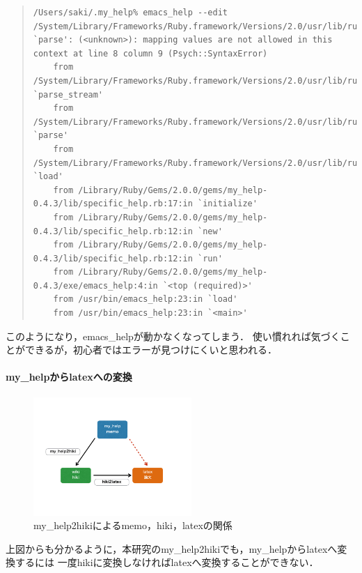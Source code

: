 \begin{quote}\begin{verbatim}
/Users/saki/.my_help% emacs_help --edit
/System/Library/Frameworks/Ruby.framework/Versions/2.0/usr/lib/ruby/2.0.0/psych.rb:205:in `parse': (<unknown>): mapping values are not allowed in this context at line 8 column 9 (Psych::SyntaxError)
	from /System/Library/Frameworks/Ruby.framework/Versions/2.0/usr/lib/ruby/2.0.0/psych.rb:205:in `parse_stream'
	from /System/Library/Frameworks/Ruby.framework/Versions/2.0/usr/lib/ruby/2.0.0/psych.rb:153:in `parse'
	from /System/Library/Frameworks/Ruby.framework/Versions/2.0/usr/lib/ruby/2.0.0/psych.rb:129:in `load'
	from /Library/Ruby/Gems/2.0.0/gems/my_help-0.4.3/lib/specific_help.rb:17:in `initialize'
	from /Library/Ruby/Gems/2.0.0/gems/my_help-0.4.3/lib/specific_help.rb:12:in `new'
	from /Library/Ruby/Gems/2.0.0/gems/my_help-0.4.3/lib/specific_help.rb:12:in `run'
	from /Library/Ruby/Gems/2.0.0/gems/my_help-0.4.3/exe/emacs_help:4:in `<top (required)>'
	from /usr/bin/emacs_help:23:in `load'
	from /usr/bin/emacs_help:23:in `<main>'
\end{verbatim}\end{quote}
\begin{description}
\item このようになり，emacs\_helpが動かなくなってしまう．
使い慣れれば気づくことができるが，初心者ではエラーが見つけにくいと思われる．
\end{description}

\paragraph{my\_helpからlatexへの変換}
\begin{figure}[htbp]\begin{center}
\includegraphics[width=6cm,bb=0 0 442 500]{my_help2hiki_saki.007.png}
\caption{my\_help2hikiによるmemo，hiki，latexの関係}
\label{default}\end{center}\end{figure}
\begin{description}
\item 上図からも分かるように，本研究のmy\_help2hikiでも，my\_helpからlatexへ変換するには
一度hikiに変換しなければlatexへ変換することができない．
\end{description}

